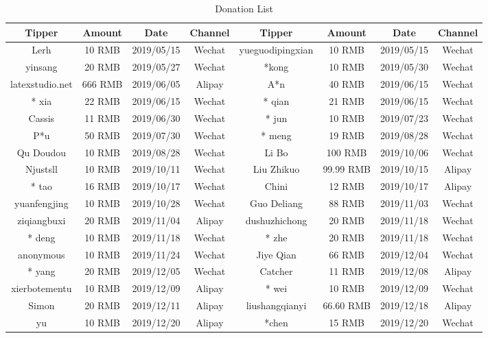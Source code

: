 \documentclass[en,hazy,device=normal,blue,14pt]{elegantnote}
\begin{document}
\begin{table}[htbp]
  \centering
  \scriptsize
  \caption{Donation List}
    \begin{tabular}{cccccccc}
    \toprule
    \textbf{Tipper} & \textbf{Amount} & \textbf{Date} & \textbf{Channel} & \textbf{Tipper} & \textbf{Amount} & \textbf{Date} & \textbf{Channel} \\
    \midrule
    Lerh  & 10 RMB & 2019/05/15 & Wechat    & yueguodipingxian & 10 RMB & 2019/05/15 & Wechat \\
	  yinsang    & 20 RMB & 2019/05/27 & Wechat    & *kong    & 10 RMB & 2019/05/30 & Wechat \\
	  latexstudio.net & 666 RMB & 2019/06/05 & Alipay   & A*n   & 40 RMB & 2019/06/15 & Wechat \\
	  * xia   & 22 RMB & 2019/06/15 & Wechat    & * qian  & 21 RMB  & 2019/06/15 & Wechat \\
	  Cassis & 11 RMB & 2019/06/30 & Wechat    & * jun    & 10 RMB & 2019/07/23 & Wechat \\
	  P*u   & 50 RMB & 2019/07/30 & Wechat    & * meng    & 19 RMB & 2019/08/28 & Wechat \\
	  Qu Doudou   & 10 RMB & 2019/08/28 & Wechat    & Li Bo    & 100 RMB & 2019/10/06 & Wechat \\
	  Njustsll & 10 RMB & 2019/10/11 & Wechat    & Liu Zhikuo   & 99.99 RMB & 2019/10/15 & Alipay \\
	  * tao   & 16 RMB & 2019/10/17 & Wechat    & Chini    & 12 RMB & 2019/10/17 & Alipay \\
	  yuanfengjing & 10 RMB & 2019/10/28 & Wechat    & Guo Deliang   & 88 RMB & 2019/11/03 & Wechat \\
	  ziqiangbuxi  & 20 RMB & 2019/11/04 & Alipay   & dushuzhichong  & 20 RMB & 2019/11/18 & Wechat \\
	  * deng    & 10 RMB & 2019/11/18 & Wechat    & * zhe   & 20 RMB & 2019/11/18 & Wechat \\
	  anonymous    & 10 RMB & 2019/11/24 & Wechat    & Jiye Qian & 66 RMB & 2019/12/04 & Wechat \\
	  * yang   & 20 RMB & 2019/12/05 & Wechat    & Catcher & 11 RMB & 2019/12/08 & Alipay \\
	  xierbotementu & 10 RMB & 2019/12/09 & Alipay   & * wei   & 10 RMB & 2019/12/09 & Wechat \\
	  Simon & 20 RMB & 2019/12/11 & Alipay   & liushangqianyi & 66.60 RMB & 2019/12/18 & Alipay \\
	  yu     & 10 RMB & 2019/12/20 & Alipay   & *chen   & 15 RMB & 2019/12/20 & Wechat \\

\end{tabular}
\end{table}
\end{document}
